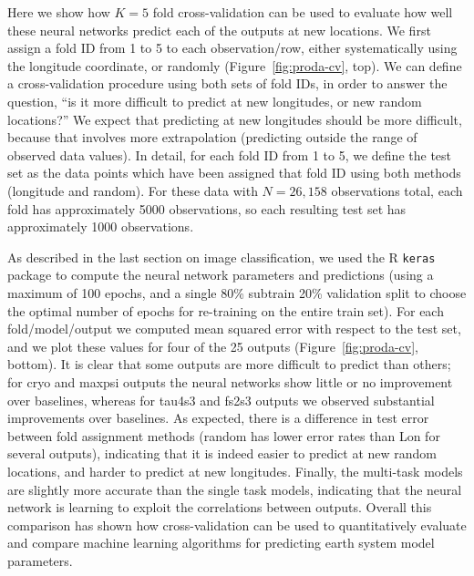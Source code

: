 \documentclass[12pt]{article}
\begin{document}
Here we show how $K=5$ fold cross-validation can be used to evaluate
how well these neural networks predict each of the outputs at new
locations. We first assign a fold ID from 1 to 5 to each
observation/row, either systematically using the longitude coordinate,
or randomly (Figure~\ref{fig:proda-cv}, top). We can define a
cross-validation procedure using both sets of fold IDs, in order to
answer the question, ``is it more difficult to predict at new
longitudes, or new random locations?'' We expect that predicting at
new longitudes should be more difficult, because that involves more
extrapolation (predicting outside the range of observed data
values). In detail, for each fold ID from 1 to 5, we define the test
set as the data points which have been assigned that fold ID using
both methods (longitude and random). For these data with $N=26,158$
observations total, each fold has approximately 5000 observations,
so each resulting test set has approximately 1000 observations.

As described in the last section on image classification, we used the
R \texttt{keras} package to compute the neural network parameters and
predictions (using a maximum of 100 epochs, and a single 80\% subtrain
20\% validation split to choose the optimal number of epochs for
re-training on the entire train set). For each fold/model/output we
computed mean squared error with respect to the test set, and we plot
these values for four of the 25 outputs (Figure~\ref{fig:proda-cv}, bottom). It is clear that some outputs are more difficult to predict
than others; for cryo and maxpsi outputs the neural networks show
little or no improvement over baselines, whereas for tau4s3 and fs2s3
outputs we observed substantial improvements over baselines. As
expected, there is a difference in test error between fold assignment
methods (random has lower error rates than Lon for several outputs),
indicating that it is indeed easier to predict at new random
locations, and harder to predict at new longitudes. Finally, the
multi-task models are slightly more accurate than the single task
models, indicating that the neural network is learning to exploit the
correlations between outputs. Overall this comparison has shown how
cross-validation can be used to quantitatively evaluate and compare
machine learning algorithms for predicting earth system model 
parameters.
\end{document}
